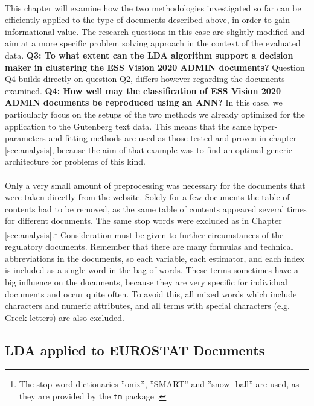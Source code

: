 \documentclass[11pt,a4paper]{article}
\begin{document}
\ \\
This chapter will examine how the two methodologies investigated so far can be efficiently applied to the type of documents described above, in order to gain informational value. The research questions in this case are slightly modified and aim at a more specific problem solving approach in the context of the evaluated data. \textbf{Q3: To what extent can the LDA algorithm support a decision maker in clustering the ESS Vision 2020 ADMIN documents?} Question Q4 builds directly on question Q2, differs however regarding the documents examined. \textbf{Q4: How well may the classification of ESS Vision 2020 ADMIN documents be reproduced using an ANN?} In this case, we particularly focus on the setups of the two methods we already optimized for the application to the Gutenberg text data. This means that the same hyper-parameters and fitting methods are used as those tested and proven in chapter \ref{sec:analysis}, because the aim of that example was to find an optimal generic architecture for problems of this kind.\\
\ \\
Only a very small amount of preprocessing was necessary for the documents that were taken directly from the website. Solely for a few documents the table of contents had to be removed, as the same table of contents appeared several times for different documents. The same stop words were excluded as in Chapter \ref{sec:analysis}.\footnote{The stop word dictionaries ”onix”, ”SMART” and ”snow- ball” are used, as they are provided by the \texttt{tm} package \cite{Silge2017}.} Consideration must be given to further circumstances of the regulatory documents. Remember that there are many formulas and technical abbreviations in the documents, so each variable, each estimator, and each index is included as a single word in the bag of words. These terms sometimes have a big influence on the documents, because they are very specific for individual documents and occur quite often. To avoid this, all mixed words which include characters and numeric attributes, and all terms with special characters (e.g. Greek letters) are also excluded.

\subsection{LDA applied to EUROSTAT Documents} \label{Example2}
\end{document}
